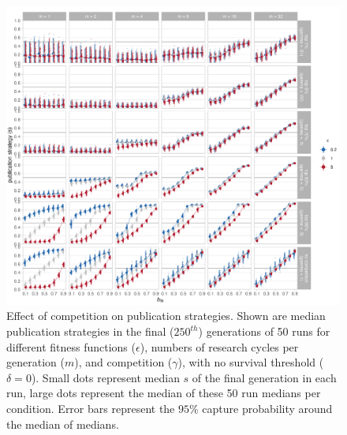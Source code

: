 \documentclass[
]{article}
\begin{document}
\begin{figure}[H]
\includegraphics[width=1.1\linewidth]{../plots/plot_gamma_line_evo} \caption{Effect of competition on publication strategies. Shown are median publication strategies in the final ($250^{th}$) generations of 50 runs for different fitness functions ($\epsilon$), numbers of research cycles per generation ($m$), and competition ($\gamma$), with no survival threshold ($\delta = 0$). Small dots represent median $s$ of the final generation in each run, large dots represent the median of these 50 run medians per condition. Error bars represent the $95\%$ capture probability around the median of medians.}\label{fig:A4-gammalineplot}
\end{figure}
\end{document}
